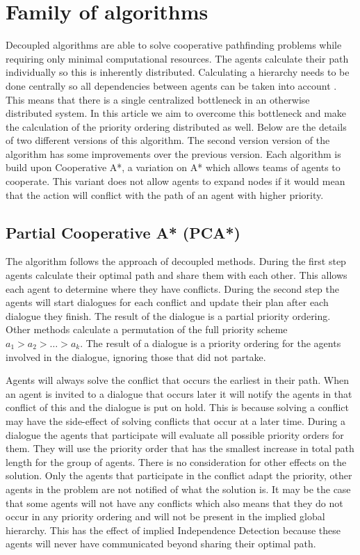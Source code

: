 \section{Family of algorithms}\label{sec:method}
Decoupled algorithms are able to solve cooperative pathfinding problems while
requiring only minimal computational resources. The agents calculate their path 
individually so this is inherently distributed. Calculating a hierarchy needs 
to be done centrally so all dependencies between agents can be taken into 
account \citep{latombe1991,bennewitz2002}. This means that there is a single 
centralized bottleneck in an otherwise distributed system. In this article we 
aim to overcome this bottleneck and make the calculation of the priority 
ordering distributed as well. Below are the details of two different versions 
of this algorithm. The second version version of the algorithm has some 
improvements over the previous version. Each algorithm is build upon 
Cooperative A*, a variation on A* \citep{hart1968} which allows teams of agents 
to cooperate. This variant does not allow agents to expand nodes if it would 
mean that the action will conflict with the path of an agent with higher 
priority.

\subsection{Partial Cooperative A* (PCA*)}
The algorithm follows the approach of decoupled methods. During the first step 
agents calculate their optimal path and share them with each other. This allows 
each agent to determine where they have conflicts. During the second step the 
agents will start dialogues for each conflict and update their plan after each 
dialogue they finish. The result of the dialogue is a partial priority 
ordering. Other methods calculate a permutation of the full priority scheme 
$a_1 > a_2 > \ldots > a_k$. The result of a dialogue is a priority ordering for 
the agents involved in the dialogue, ignoring those that did not partake.

Agents will always solve the conflict that occurs the earliest in their path. 
When an agent is invited to a dialogue that occurs later it will notify the 
agents in that conflict of this and the dialogue is put on hold. This is 
because solving a conflict may have the side-effect of solving conflicts that 
occur at a later time. During a dialogue the agents that participate will 
evaluate all possible priority orders for them. They will use the priority 
order that has the smallest increase in total path length for the group of 
agents. There is no consideration for other effects on the solution. Only the 
agents that participate in the conflict adapt the priority, other agents in the 
problem are not notified of what the solution is. It may be the case that some 
agents will not have any conflicts which also means that they do not occur in 
any priority ordering and will not be present in the implied global hierarchy. 
This has the effect of implied Independence Detection because these agents will 
never have communicated beyond sharing their optimal path.

